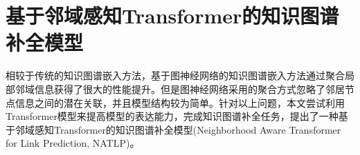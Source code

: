 \chapter{基于邻域感知Transformer的知识图谱补全模型}



相较于传统的知识图谱嵌入方法，基于图神经网络的知识图谱嵌入方法通过聚合局部邻域信息获得了很大的性能提升。但是图神经网络采用的聚合方式忽略了邻居节点信息之间的潜在关联，并且模型结构较为简单。针对以上问题，本文尝试利用Transformer模型来提高模型的表达能力，完成知识图谱补全任务，提出了一种基于邻域感知Transformer的知识图谱补全模型(Neighborhood Aware Transformer for Link Prediction, NATLP)。







